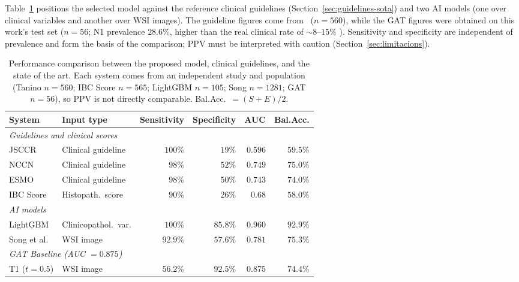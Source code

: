 \documentclass[10pt,a4paper,twocolumn,twoside]{article}
\begin{document}
Table~\ref{tab:comparison} positions the selected model against the reference clinical
guidelines (Section~\ref{sec:guidelines-sota}) and two AI models (one over
clinical variables and another over WSI images).
The guideline figures come from~\cite{tanino2024comparative} ($n\!=\!560$),
while the GAT figures were obtained on this work's test set ($n\!=\!56$;
N1 prevalence $28.6\%$, higher than the real clinical rate of $\sim\!8$–$15\%$
\cite{zaffalon2023}). Sensitivity and specificity are independent of
prevalence and form the basis of the comparison; PPV must be interpreted with
caution (Section~\ref{sec:limitacions}).

\begin{table}[h]
\centering
\caption{Performance comparison between the proposed model, clinical guidelines, and the state of the art.
Each system comes from an independent study and population
(Tanino $n\!=\!560$; IBC Score $n\!=\!565$; LightGBM $n\!=\!105$; Song $n\!=\!1281$; GAT $n\!=\!56$),
so PPV is not directly comparable. Bal.Acc.~$=(S\!+\!E)/2$.}
\label{tab:comparison}
\small
\begin{tabular}{llrrrr}
\toprule
\textbf{System} & \textbf{Input type} & \textbf{Sensitivity} & \textbf{Specificity} & \textbf{AUC} & \textbf{Bal.Acc.} \\
\midrule
\multicolumn{6}{l}{\textit{Guidelines and clinical scores}} \\[2pt]
JSCCR \cite{jsccr2019}        & Clinical guideline  & $100\%$ & $19\%$  & $0.596$ & $59.5\%$ \\
NCCN                           & Clinical guideline  & $98\%$  & $52\%$  & $0.749$ & $75.0\%$ \\
ESMO \cite{tanino2024comparative} & Clinical guideline  & $98\%$  & $50\%$  & $0.743$ & $74.0\%$ \\
IBC Score \cite{dawson2024budding} & Histopath.\ score & $90\%$ & $26\%$ & $0.68$ & $58.0\%$ \\
\midrule
\multicolumn{6}{l}{\textit{AI models}} \\[2pt]
LightGBM \cite{piao2023ai}                          & Clinicopathol.\ var. & $100\%$  & $85.8\%$ & $0.960$ & $92.9\%$ \\
Song et al.\ \cite{song2024lnm}                     & WSI image & $92.9\%$ & $57.6\%$ & $0.781$ & $75.3\%$ \\
\multicolumn{6}{l}{\textit{GAT Baseline (AUC $= 0.875$)}} \\[1pt]
\quad T1 ($t\!=\!0.5$)                                        & WSI image & $56.2\%$ & $92.5\%$ & $0.875$ & $74.4\%$ \\

\end{tabular}
\end{table}
\end{document}
